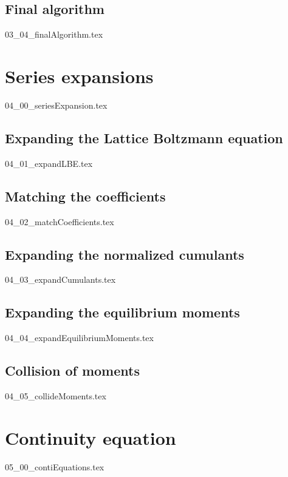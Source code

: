 \documentclass[12pt,a4paper,twoside]{article}
\begin{document}
\subsection{Final algorithm}
\label{sub: Final algorithm}
{03_04_finalAlgorithm.tex}

\section{Series expansions}
\label{sec: Series expansions}
{04_00_seriesExpansion.tex}


\subsection{Expanding the Lattice Boltzmann equation}
\label{sub: Expanding the Lattice Boltzmann equation}
{04_01_expandLBE.tex}

\subsection{Matching the coefficients}
\label{sub: Matching the coefficients}
{04_02_matchCoefficients.tex}

\subsection{Expanding the normalized cumulants}
\label{sub: Expanding the normalized cumulants}
{04_03_expandCumulants.tex}

\subsection{Expanding the equilibrium moments}
\label{sub: Expanding the equilibrium moments}
{04_04_expandEquilibriumMoments.tex}

\subsection{Collision of moments}
\label{sub: Collision of moments}
{04_05_collideMoments.tex}

\section{Continuity equation}
\label{sec: Continuity equation}
{05_00_contiEquations.tex}
\end{document}
